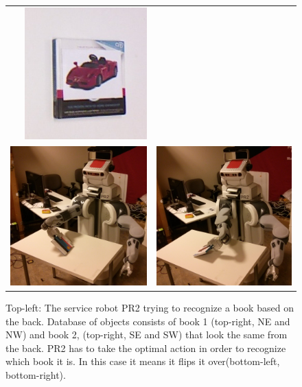 \documentclass[conference]{IEEEtran}
\begin{document}
\begin{figure}[ht]
\begin{tabular}{cccc}
    &\includegraphics[width=0.23\columnwidth]{pics/first_cover2.jpg} \\
    \multicolumn{2}{c}{\includegraphics[width=0.45\columnwidth]{pics/pr2_grasp.jpg}}
    & \multicolumn{2}{c}{\includegraphics[width=0.45\columnwidth]{pics/pr2_rotate.jpg}}
    \end{tabular}
    \caption{Top-left: The service robot PR2 trying to recognize a book based on the back. Database of objects consists of book 1 (top-right, NE and NW) and book 2, (top-right, SE and SW) that look the same from the back. PR2 has to take the optimal action in order to recognize which book it is. In this case it means it flips it over(bottom-left, bottom-right).}
    \label{fig:pr2}
    \end{figure}

\end{document}
